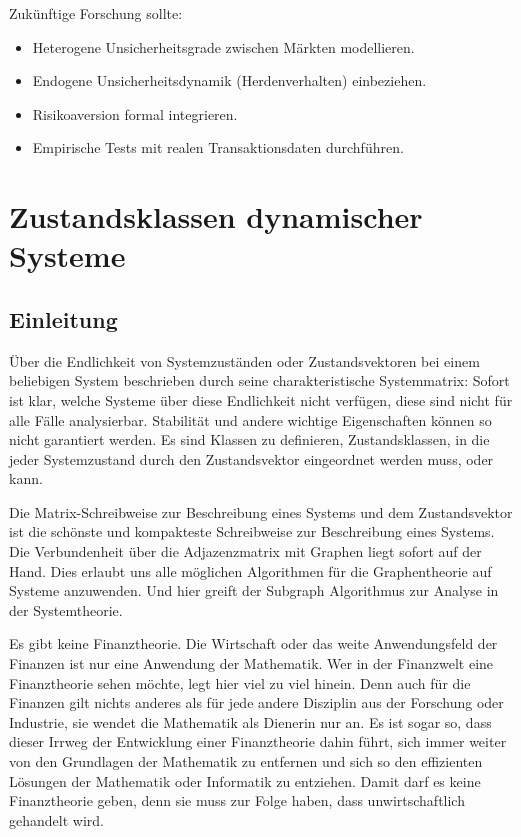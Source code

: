 \documentclass[a4paper, 12pt, twoside, openright]{report}
\theoremstyle{definition}
\theoremstyle{definition}
\begin{document}
Zukünftige Forschung sollte:
\begin{itemize}
    \item Heterogene Unsicherheitsgrade zwischen Märkten modellieren.
    \item Endogene Unsicherheitsdynamik (Herdenverhalten) einbeziehen.
    \item Risikoaversion formal integrieren.
    \item Empirische Tests mit realen Transaktionsdaten durchführen.
\end{itemize}

\cleardoublepage


\chapter{Zustandsklassen dynamischer Systeme}
\label{ch:state-classes}

\section{Einleitung}

Über die Endlichkeit von Systemzuständen oder Zustandsvektoren bei einem beliebigen
System beschrieben durch seine charakteristische Systemmatrix: Sofort ist klar, welche Systeme
über diese Endlichkeit nicht verfügen, diese sind nicht für alle Fälle analysierbar. Stabilität
und andere wichtige Eigenschaften können so nicht garantiert werden. Es sind Klassen zu
definieren, Zustandsklassen, in die jeder Systemzustand durch den Zustandsvektor
eingeordnet werden muss, oder kann.

Die Matrix-Schreibweise zur Beschreibung eines Systems und dem Zustandsvektor ist die
schönste und kompakteste Schreibweise zur Beschreibung eines Systems. Die Verbundenheit
über die Adjazenzmatrix mit Graphen liegt sofort auf der Hand. Dies erlaubt uns alle
möglichen Algorithmen für die Graphentheorie auf Systeme anzuwenden. Und hier greift der
Subgraph Algorithmus zur Analyse in der Systemtheorie.

Es gibt keine Finanztheorie. Die Wirtschaft oder das weite Anwendungsfeld der Finanzen
ist nur eine Anwendung der Mathematik. Wer in der Finanzwelt eine Finanztheorie sehen
möchte, legt hier viel zu viel hinein. Denn auch für die Finanzen gilt nichts anderes
als für jede andere Disziplin aus der Forschung oder Industrie, sie wendet
die Mathematik als Dienerin nur an. Es ist sogar so, dass dieser Irrweg der Entwicklung
einer Finanztheorie dahin führt, sich immer weiter von den Grundlagen der Mathematik zu
entfernen und sich so den effizienten Lösungen der Mathematik oder Informatik zu
entziehen. Damit darf es keine Finanztheorie geben, denn sie muss zur Folge haben, dass
unwirtschaftlich gehandelt wird.
\end{document}
